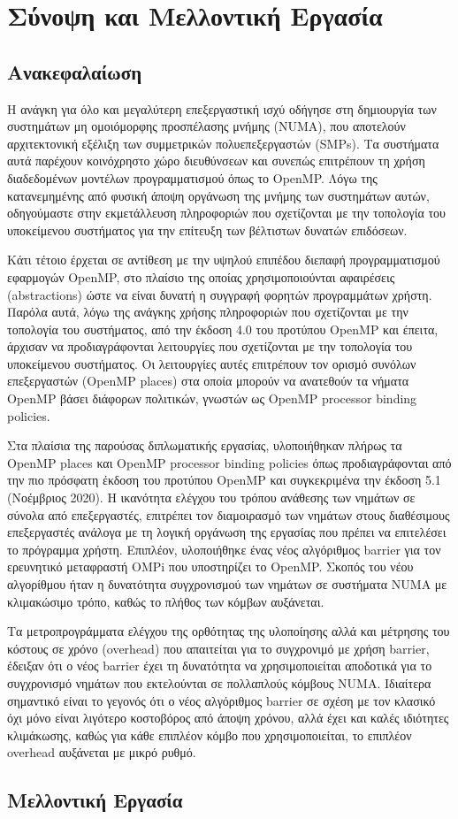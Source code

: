 \chapter{Σύνοψη και Μελλοντική Εργασία}

\section{Ανακεφαλαίωση}
Η ανάγκη για όλο και μεγαλύτερη επεξεργαστική ισχύ οδήγησε στη δημιουργία των συστημάτων μη ομοιόμορφης προσπέλασης μνήμης (NUMA), που αποτελούν αρχιτεκτονική εξέλιξη των συμμετρικών πολυεπεξεργαστών (SMPs). Τα συστήματα αυτά παρέχουν κοινόχρηστο χώρο διευθύνσεων και συνεπώς επιτρέπουν τη χρήση διαδεδομένων μοντέλων προγραμματισμού όπως το OpenMP. Λόγω της κατανεμημένης από φυσική άποψη οργάνωση της μνήμης των συστημάτων αυτών, οδηγούμαστε στην εκμετάλλευση πληροφοριών που σχετίζονται με την τοπολογία του υποκείμενου συστήματος για την επίτευξη των βέλτιστων δυνατών επιδόσεων.

Κάτι τέτοιο έρχεται σε αντίθεση με την υψηλού επιπέδου διεπαφή προγραμματισμού εφαρμογών OpenMP, στο πλαίσιο της οποίας χρησιμοποιούνται αφαιρέσεις (abstractions) ώστε να είναι δυνατή η συγγραφή φορητών προγραμμάτων χρήστη. Παρόλα αυτά, λόγω της ανάγκης χρήσης πληροφοριών που σχετίζονται με την τοπολογία του συστήματος, από την έκδοση 4.0 του προτύπου OpenMP και έπειτα, άρχισαν να προδιαγράφονται λειτουργίες που σχετίζονται με την τοπολογία του υποκείμενου συστήματος. Οι λειτουργίες αυτές επιτρέπουν τον ορισμό συνόλων επεξεργαστών (OpenMP places) στα οποία μπορούν να ανατεθούν τα νήματα OpenMP βάσει διάφορων πολιτικών, γνωστών ως OpenMP processor binding policies.

Στα πλαίσια της παρούσας διπλωματικής εργασίας, υλοποιήθηκαν πλήρως τα OpenMP places και OpenMP processor binding policies όπως προδιαγράφονται από την πιο πρόσφατη έκδοση του προτύπου OpenMP και συγκεκριμένα την έκδοση 5.1 (Νοέμβριος 2020). Η ικανότητα ελέγχου του τρόπου ανάθεσης των νημάτων σε σύνολα από επεξεργαστές, επιτρέπει τον διαμοιρασμό των νημάτων στους διαθέσιμους επεξεργαστές ανάλογα με τη λογική οργάνωση της εργασίας που πρέπει να επιτελέσει το πρόγραμμα χρήστη. Επιπλέον, υλοποιήθηκε ένας νέος αλγόριθμος barrier για τον ερευνητικό μεταφραστή OMPi που υποστηρίζει το OpenMP. Σκοπός του νέου αλγορίθμου ήταν η δυνατότητα συγχρονισμού των νημάτων σε συστήματα NUMA με κλιμακώσιμο τρόπο, καθώς το πλήθος των κόμβων αυξάνεται.

Τα μετροπρογράμματα ελέγχου της ορθότητας της υλοποίησης αλλά και μέτρησης του κόστους σε χρόνο (overhead) που απαιτείται για το συγχρονιμό με χρήση barrier, έδειξαν ότι ο νέος barrier έχει τη δυνατότητα να χρησιμοποιείται αποδοτικά για το συγχρονισμό νημάτων που εκτελούνται σε πολλαπλούς κόμβους NUMA. Ιδιαίτερα σημαντικό είναι το γεγονός ότι ο νέος αλγόριθμος barrier σε σχέση με τον κλασικό όχι μόνο είναι λιγότερο κοστοβόρος από άποψη χρόνου, αλλά έχει και καλές ιδιότητες κλιμάκωσης, καθώς για κάθε επιπλέον κόμβο που χρησιμοποιείται, το επιπλέον overhead αυξάνεται με μικρό ρυθμό.

\section{Μελλοντική Εργασία}
